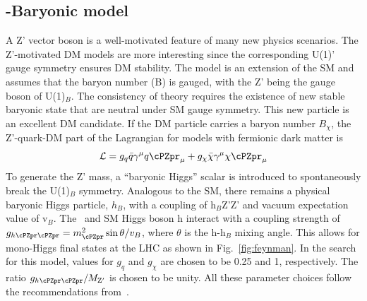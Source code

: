%
%
%
%
%



\subsection{ \cPZpr-Baryonic model}
A Z' vector boson is a well-motivated feature of many new physics scenarios. 
The Z'-motivated DM models are more interesting since the corresponding U(1)' 
gauge symmetry ensures DM stability. The model is an extension of the SM and 
assumes that the baryon number (B) is gauged, with the Z' being the gauge 
boson of U(1)$_{B}$. The consistency of theory requires the existence of new 
stable baryonic state that are neutral under SM gauge symmetry. This new 
particle is an excellent DM candidate. If the DM particle carries a baryon 
number $B_{\chi}$, the Z'-quark-DM part of the Lagrangian for models with 
fermionic dark matter is 
\begin{equation}
{\cal L} = g_q \bar{q}\gamma^{\mu}q\cPZpr_{\mu}+g_{\chi}\bar{\chi}\gamma^{\mu}\chi\cPZpr_{\mu}
\end{equation}
To generate the Z' mass, a ``baryonic Higgs'' scalar is introduced to 
spontaneously break the U(1)$_B$ symmetry. Analogous to the SM, there remains 
a physical baryonic Higgs particle, $h_{B}$, with a coupling of h$_{B}$Z'Z' 
and vacuum expectation value of v$_{B}$. 
The \cPZpr\ and SM Higgs boson h interact with a coupling strength of 
$g_{h\cPZpr\cPZpr} = m_{\cPZpr}^{2} \sin \theta/v_{B}$, where $\theta$ is the h-h$_{B}$ 
mixing angle. This allows for mono-Higgs final states at the LHC as shown in 
Fig.~\ref{fig:feynman}. In the search for this model, values for $g_q$ and $g_\chi$ are chosen to be 0.25 and 1, respectively. The ratio $g_{h\cPZpr\cPZpr}/M_{\mathrm{Z}'}$ is chosen to be unity. All these parameter choices follow the recommendations from~\cite{Abercrombie:2015wmb}.  



